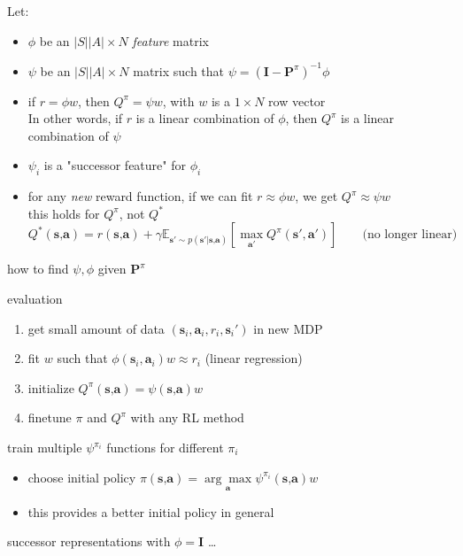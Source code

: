 Let:
\begin{itemize}
	\item $\phi$ be an $|S||A| \times N$ \textit{feature} matrix
	\item $\psi$ be an $|S||A| \times N$ matrix such that $\psi = (\textbf{I} - \textbf{P}^\pi)^{-1}\phi$
	\item if $r=\phi w$, then $Q^\pi = \psi w$, with $w$ is a $1 \times N$ row vector\\
	In other words, if $r$ is a linear combination of $\phi$, then $Q^\pi$ is a linear combination of $\psi$
	\item $\psi_i$ is a "successor feature" for $\phi_i$
	\item for any \textit{new} reward function, if we can fit $r \approx \phi w$, we get $Q^\pi \approx \psi w$\\
	\note this holds for $Q^\pi$, not $Q^*$
	\[ Q^*(\textbf{s,a}) = r(\textbf{s,a}) + \gamma \mathbb{E}_{\textbf{s}' \sim p(\textbf{s}'|\textbf{s,a})}\left[ \underset{\textbf{a}'}{\max} Q^\pi(\textbf{s}', \textbf{a}') \right] \qquad \text{(no longer linear)}\]
\end{itemize}

\todo{} how to find $\psi, \phi$ given $\textbf{P}^\pi$

 evaluation
\begin{enumerate}
	\item get small amount of data $(\textbf{s}_i, \textbf{a}_i, r_i, \textbf{s}_i')$ in new \ac{MDP}
	\item fit $w$ such that $\phi(\textbf{s}_i, \textbf{a}_i)w \approx r_i$ (linear regression)
	\item initialize $Q^\pi(\textbf{s,a}) = \psi(\textbf{s,a}) w$
	\item finetune $\pi$ and $Q^\pi$ with any \ac{RL} method
\end{enumerate}

 train multiple $\psi^{\pi_i}$ functions for different $\pi_i$
\begin{itemize}
	\item choose initial policy $\pi(\textbf{s,a}) = \underset{\textbf{a}}{\arg\max} \psi^{\pi_i}(\textbf{s,a}) w$
	\item this provides a better initial policy in general
\end{itemize}

 successor representations with $\phi = \textbf{I}$ \dots \cite{dayan1993improving}
